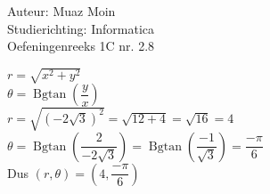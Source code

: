 \documentclass[a4paper]{article}
\begin{document}
  
\noindent \large Auteur: Muaz Moin\\
\noindent \large Studierichting: Informatica\\
\noindent \large Oefeningenreeks 1C nr. 2.8\\

\medskip

\normalsize


$r = \sqrt{x^2 + y^2}$\\

$\theta = \operatorname{Bgtan}\left(\dfrac{y}{x}\right)$\\

$r = \sqrt{\left(-2\sqrt{3}\right)^2} = \sqrt{12+4} = \sqrt{16} = 4$\\

$\theta = \operatorname{Bgtan}\left(\dfrac{2}{-2\sqrt{3}}\right) = \operatorname{Bgtan}\left(\dfrac{-1}{\sqrt{3}}\right) = \dfrac{-\pi}{6}$\\

Dus $(r,\theta) = \left(4, \dfrac{-\pi}{6}\right)$\\

\begin{thebibliography}{999}
\end{thebibliography}
\end{document}
